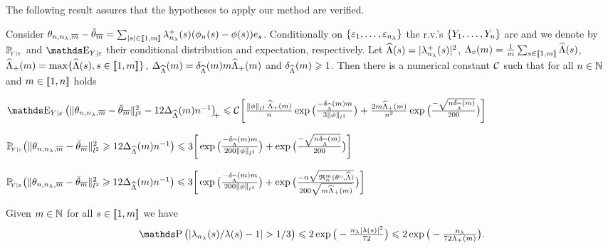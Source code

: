 The following result assures that the hypotheses to apply our method are verified.
\begin{lm}\label{re:cconc}
  Consider
  $\hxdfPr-\dxdfPr=\sum_{|s|\in\nset{1,\Di}}\hfedfmpI[(s)](\hfydf[(s)]-\fydf[(s)])\bas_s$.
  Conditionally on $\{\rE_1,\dotsc,\rE_{\ssE}\}$ the r.v.'s
  $\{\rY_1,\dotsc,\rY_{\ssY}\}$ are \iid and we denote by
  $\FuVg[]{\rY|\rE}$ and $\E_{\rY\vert\rE}$ their conditional
  distribution and expectation, respectively.  Let
  $\eiSv[(s)]=|\hfedfmpI[(s)]|^2$,
  $\oeiSv=\tfrac{1}{\Di}\sum_{s\in\nset{1,\Di}}\eiSv[(s)]$,
  $\meiSv= \max\{\eiSv[(s)],s\in\nset{1,\Di}\}$,
  $\DiepenSv=\cmeiSv\Di \meiSv$ and $\cmeiSv\geq1$.  Then there is a
  numerical constant $\cst{}$ such that for all $\ssY\in\Nz$ and
  $\Di\in\nset{1,\ssY}$ holds
  \begin{resListeN}[]
  \item\label{re:cconc:i}
    $\E_{\rY\vert\rE} \vectp{\Vnormlp{\hxdfPr-\dxdfPr}^2 - 12\DiepenSv\ssY^{-1}}
    \\ \leq \cst{} \bigg[\tfrac{\Vnormlp[1]{\fydf}\,\meiSv}{\ssY}
    \exp\big(\tfrac{-\cmeiSv\Di}{3\Vnormlp[1]{\fydf}}\big)
    +\tfrac{2\Di\meiSv}{n^2}\exp\big(\tfrac{-\sqrt{\ssY\cmeiSv}}{200}\big) \bigg]$
  \item\label{re:cconc:ii}
$\FuVg[]{\rY|\rE}\big(\Vnormlp{\hxdfPr-\dxdfPr}^2 \geq 12\DiepenSv\ssY^{-1}\big)\leq 
3 \bigg[\exp\big(\tfrac{-\cmeiSv\Di}{200\Vnormlp[1]{\fydf}}\big)
+\exp\big(\tfrac{-\sqrt{\ssY\cmeiSv}}{200}\big)\bigg]$
   \item\label{re:cconc:iii}
     $\FuVg[]{\rY|\rE}\big(\Vnormlp{\hxdfPr-\dxdfPr}^2 \geq 12\DiepenSv\ssY^{-1}\big)\leq 
     3 \bigg[\exp\big(\tfrac{-\cmeiSv\Di}{200\Vnormlp[1]{\fydf}}\big)
     +\exp\big(\tfrac{-\ssY\sqrt{\daRa{\Di}{(\xdf,\eiSv)}}}{200\sqrt{\Di\meiSv}}\big)\bigg]$
\end{resListeN}
\reEnd
\end{lm}

\begin{lm}\label{re:xevent}
Given $\Di\in\Nz$ for all $s\in\nset{1,\Di}$ we have
\begin{equation}\label{re:xevent:e1}
\P\big(|\hfedf[(s)]/\fedf[(s)]-1|>1/3\big)\leq 2\exp\big(-\tfrac{\ssE|\fedf[(s)]|^2}{72}\big)\leq 2\exp\big(-\tfrac{\ssE}{72\miSv}\big).
\end{equation}
\end{lm}


